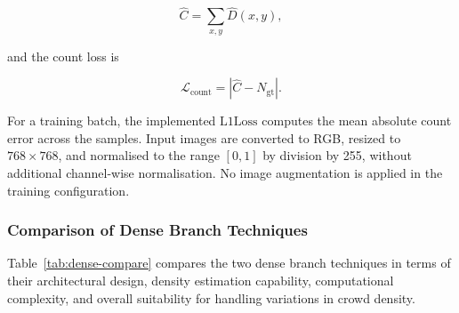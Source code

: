 \begin{equation}
	\hat C=\sum_{x,y}\hat D(x,y),
\end{equation}

and the count loss is

\begin{equation}
	\mathcal{L}_{\text{count}}=|\hat C-N_{\text{gt}}|.
\end{equation}

For a training batch, the implemented $\mathrm{L1Loss}$ computes the mean absolute count error across the samples. Input images are converted to RGB, resized to $768{\times}768$, and normalised to the range $[0,1]$ by division by 255, without additional channel-wise normalisation. No image augmentation is applied in the training configuration.

\subsubsection{Comparison of Dense Branch Techniques}
\label{sec:dense-comparison}

Table~\ref{tab:dense-compare} compares the two dense branch techniques in terms of their architectural design, density estimation capability, computational complexity, and overall suitability for handling variations in crowd density.

